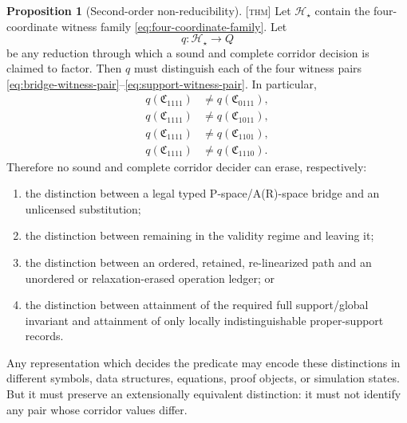 \documentclass[11pt]{article}
\newcommand{\Thm}{\textsc{[thm]}}
\theoremstyle{definition}
\newtheorem{sproposition}{Proposition}
\begin{document}
\begin{sproposition}[Second-order non-reducibility]
\label{prop:second-order-nonreducibility}
\Thm{} Let $\mathcal H_\star$ contain the four-coordinate witness family
\eqref{eq:four-coordinate-family}. Let
\begin{equation}
q:\mathcal H_\star\longrightarrow Q
\label{eq:putative-reduction}
\end{equation}
be any reduction through which a sound and complete corridor decision is
claimed to factor. Then $q$ must distinguish each of the four witness pairs
\eqref{eq:bridge-witness-pair}--\eqref{eq:support-witness-pair}. In particular,
\begin{align}
q(\mathfrak C_{1111})&\neq q(\mathfrak C_{0111}),
\label{eq:must-retain-bridge}
\\
q(\mathfrak C_{1111})&\neq q(\mathfrak C_{1011}),
\label{eq:must-retain-regime}
\\
q(\mathfrak C_{1111})&\neq q(\mathfrak C_{1101}),
\label{eq:must-retain-history}
\\
q(\mathfrak C_{1111})&\neq q(\mathfrak C_{1110}).
\label{eq:must-retain-support}
\end{align}
Therefore no sound and complete corridor decider can erase, respectively:
\begin{enumerate}
\item the distinction between a legal typed P-space/A(R)-space bridge and an
unlicensed substitution;

\item the distinction between remaining in the validity regime and leaving it;

\item the distinction between an ordered, retained, re-linearized path and an
unordered or relaxation-erased operation ledger; or

\item the distinction between attainment of the required full support/global
invariant and attainment of only locally indistinguishable proper-support records.
\end{enumerate}
Any representation which decides the predicate may encode these distinctions in
different symbols, data structures, equations, proof objects, or simulation
states. But it must preserve an extensionally equivalent distinction: it must not
identify any pair whose corridor values differ.
\end{sproposition}
\end{document}
